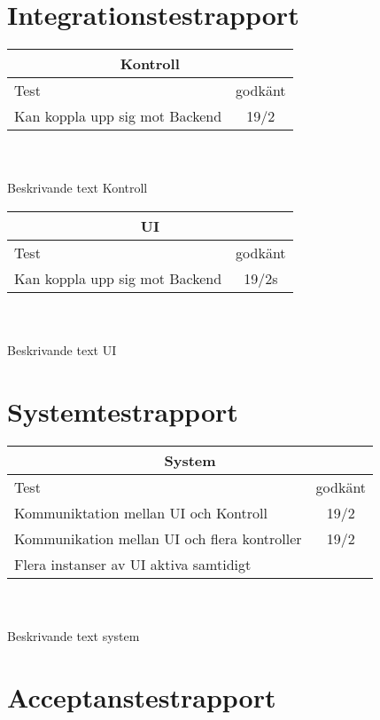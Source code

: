 \documentclass[10pt]{article}
\begin{document}
\section{Integrationstestrapport}
  \begin{tabular}{|l| c|}
  \hline
    \multicolumn{2}{|c|}{Kontroll}\\
    \hline
    Test&godkänt\\
   \hline
   Kan koppla upp sig mot Backend&19/2\\
   \hline
   
  \end{tabular}
  \\
  \\
  Beskrivande text Kontroll
  \\
  \noindent
\begin{tabular}{|l| c|}
  \hline
    \multicolumn{2}{|c|}{UI}\\
    \hline
    Test&godkänt\\
    \hline
    Kan koppla upp sig mot Backend&19/2s\\
    \hline
   
  \end{tabular}
  \\
  \\
  Beskrivande text UI
  \\
\section{Systemtestrapport}
  \begin{tabular}{|l| c|}
  \hline
    \multicolumn{2}{|c|}{System}\\
    \hline
    Test&godkänt\\
   \hline
   Kommuniktation mellan UI och Kontroll&19/2\\
   \hline
   Kommunikation mellan UI och flera kontroller&19/2\\
   \hline
   Flera instanser av UI aktiva samtidigt&\\
   \hline
   
  \end{tabular}
  \\
  \\
  Beskrivande text system
  \\
  
\section{Acceptanstestrapport}
	

\printbibliography
	
\end{document}
